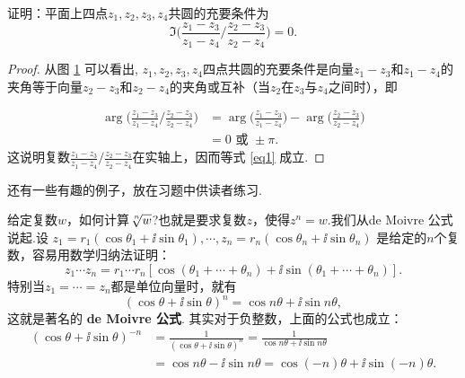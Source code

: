 \begin{example}
证明：平面上四点$z_1,z_2,z_3,z_4$共圆的充要条件为
\begin{equation}\label{eq1}
\Im\bigg(\frac{z_1-z_3}{z_1-z_4}\bigg/\frac{z_2-z_3}{z_2-z_4}\bigg)=0.
\end{equation}
\end{example}
\begin{proof}
从图 \ref{fig1.4} 可以看出, $z_1,z_2,z_3,z_4$四点共圆的充要条件是向量$z_1-z_3$和$z_1-z_4$的夹角等于向量$z_2-z_3$和$z_2-z_4$的夹角或互补（当$z_2$在$z_3$与$z_4$之间时），即
\begin{figure}
  \centering
\caption{\label{fig1.4}}
\end{figure}
\begin{align*}
\arg\bigg(\frac{z_1-z_3}{z_1-z_4}\bigg/\frac{z_2-z_3}{z_2-z_4}\bigg)
&=\arg\bigg(\frac{z_1-z_3}{z_1-z_4}\bigg)-\arg\bigg(\frac{z_2-z_3}{z_2-z_4}\bigg)\\
&=0\text{ 或 }\pm\pi.
\end{align*}
这说明复数$\frac{z_1-z_3}{z_1-z_4}\bigg/\frac{z_2-z_3}{z_2-z_4}$在实轴上，因而等式 \eqref{eq1} 成立.
\end{proof}


还有一些有趣的例子，放在习题中供读者练习.

给定复数$w$，如何计算$\sqrt[\leftroot{-1}\uproot{2} n]{w}$?也就是要求复数$z$，使得$z^n=w$.我们从de Moivre 公式说起.设
$z_1=r_1(\cos\theta_1+\ii\sin\theta_1),\cdots,z_n=r_n(\cos\theta_n+\ii\sin\theta_n)$
是给定的$n$个复数，容易用数学归纳法证明：
\[z_1\cdots z_n=r_1\cdots r_n[\cos(\theta_1+\cdots+\theta_n)+\ii\sin(\theta_1+\cdots+\theta_n)].\]
特别当$z_1=\cdots=z_n$都是单位向量时，就有
\[(\cos\theta+\ii\sin\theta)^n=\cos n\theta+\ii\sin n\theta,\]
这就是著名的 \textbf{de Moivre 公式}. 其实对于负整数，上面的公式也成立：
\begin{align*}
(\cos\theta+\ii\sin\theta)^{-n}&=\frac1{(\cos\theta+\ii\sin\theta)^n}
=\frac1{\cos n\theta+\ii\sin n\theta}\\
&=\cos n\theta-\ii\sin n\theta=\cos(-n)\theta+\ii\sin(-n)\theta.
\end{align*}

